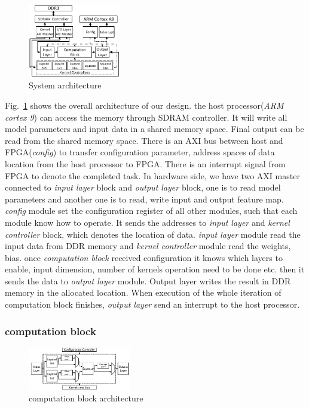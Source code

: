 \documentclass[conference]{IEEEtran}
\begin{document}
\begin{figure}[htbp]
\centerline{\includegraphics[width=0.36\textwidth]{archiecture.pdf}}
\caption{System architecture}
\label{arch}
\end{figure}

Fig.~\ref{arch} shows the overall architecture of our design. the host processor(\textit{ARM cortex 9}) can access the memory through SDRAM controller. It will write all model parameters and input data in a shared memory space. Final output can be read from the shared memory space. There is an AXI bus between host and FPGA(\textit{config}) to transfer configuration parameter, address spaces of data location from the host processor to FPGA. There is an interrupt signal from FPGA to denote the completed task. In hardware side, we have two AXI master connected to \textit{input layer} block and \textit{output layer} block, one is to read model parameters and another one is to read, write input and output feature map. \textit{config} module set the configuration register of all other modules, such that each module know how to operate. It sends the addresses to \textit{input layer} and \textit{kernel controller} block, which denotes the location of data. \textit{input layer} module read the input data from DDR memory and \textit{kernel controller} module read the weights, bias. once \textit{computation block} received configuration it knows which layers to enable, input dimension, number of kernels operation need to be done etc. then it sends the data to \textit{output layer} module. Output layer writes the result in DDR memory in the allocated location. When execution of the whole iteration of computation block finishes, \textit{output layer} send an interrupt to the host processor.


\subsubsection{computation block}

\begin{figure}[htbp]
\centerline{\includegraphics[width=0.4\textwidth]{computation.pdf}}
\caption{computation block architecture}
\label{cmp}
\end{figure}
\end{document}
